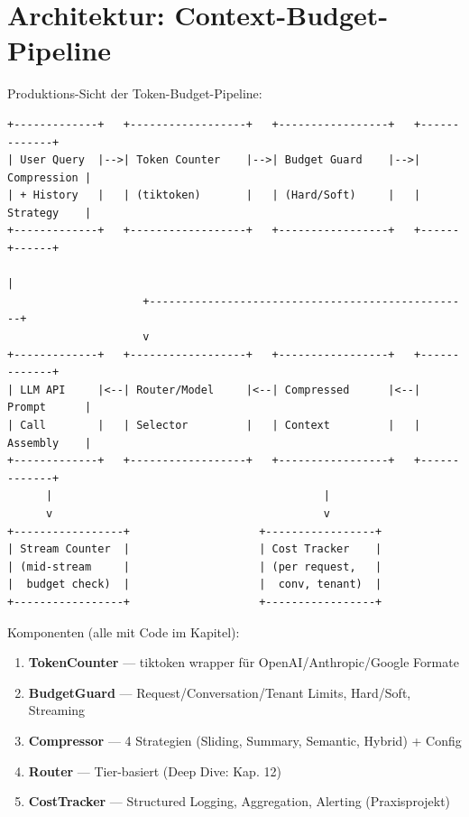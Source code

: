 \section{Architektur: Context-Budget-Pipeline}
\label{sec:architecture}

Produktions-Sicht der Token-Budget-Pipeline:

\begin{verbatim}
+-------------+   +------------------+   +-----------------+   +-------------+
| User Query  |-->| Token Counter    |-->| Budget Guard    |-->| Compression |
| + History   |   | (tiktoken)       |   | (Hard/Soft)     |   | Strategy    |
+-------------+   +------------------+   +-----------------+   +------+------+
                                                                         |
                     +--------------------------------------------------+
                     v
+-------------+   +------------------+   +-----------------+   +-------------+
| LLM API     |<--| Router/Model     |<--| Compressed      |<--| Prompt      |
| Call        |   | Selector         |   | Context         |   | Assembly    |
+-------------+   +------------------+   +-----------------+   +-------------+
      |                                          |
      v                                          v
+-----------------+                    +-----------------+
| Stream Counter  |                    | Cost Tracker    |
| (mid-stream     |                    | (per request,   |
|  budget check)  |                    |  conv, tenant)  |
+-----------------+                    +-----------------+
\end{verbatim}

Komponenten (alle mit Code im Kapitel):
\begin{enumerate}[leftmargin=*]
  \item \textbf{TokenCounter} --- tiktoken wrapper für OpenAI/Anthropic/Google Formate
  \item \textbf{BudgetGuard} --- Request/Conversation/Tenant Limits, Hard/Soft, Streaming
  \item \textbf{Compressor} --- 4 Strategien (Sliding, Summary, Semantic, Hybrid) + Config
  \item \textbf{Router} --- Tier-basiert (Deep Dive: Kap. 12)
  \item \textbf{CostTracker} --- Structured Logging, Aggregation, Alerting (Praxisprojekt)
\end{enumerate}

